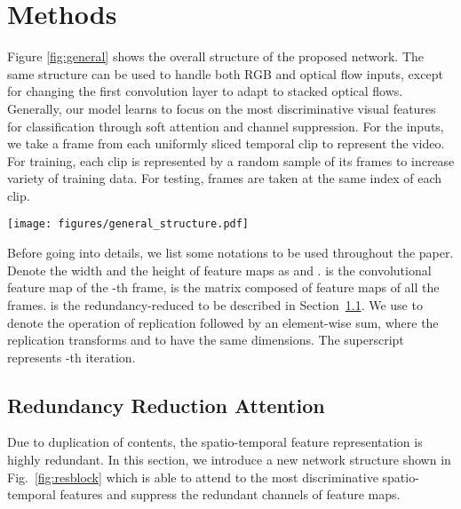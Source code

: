 \documentclass[runningheads]{llncs}
\begin{document}
 \section{Methods}
Figure \ref{fig:general} shows the overall structure of the proposed network. The same structure can be used to handle both RGB and optical flow inputs, except for changing the first convolution layer to adapt to stacked optical flows. Generally, our model learns to focus on the most discriminative visual features for classification through soft attention and channel suppression. For the inputs, we take a frame from each uniformly sliced temporal clip to represent the video. For training, each clip is represented by a random sample of its frames to increase variety of training data. For testing, frames are taken at the same index of each clip.
\begin{figure*}[htbp]
\centering
\texttt{[image: figures/general\_structure.pdf]}
\caption{The general structure of the proposed model. Input sequences are divided into clips of the same length. One frame or flow stack is sampled from each clip. The CNNs extract feature maps from the sampled frames, then the RRA modules iteratively updates the feature maps. Each summary feature vector gives one classification score via the classifiers, and the scores are averaged as the final prediction. }
\label{fig:general}
\end{figure*}
Before going into details, we list some notations to be used throughout the paper. Denote the width and the height of feature maps as  and .  is the convolutional feature map of the -th frame,  is the matrix composed of feature maps of all the  frames.  is the redundancy-reduced  to be described in Section~\ref{sec:rra}. We use  to denote the operation of replication followed by an element-wise sum, where the replication transforms  and  to have the same dimensions. The superscript  represents -th iteration.




\subsection{Redundancy Reduction Attention}\label{sec:rra}
Due to duplication of contents, the spatio-temporal feature representation  is highly redundant. In this section, we introduce a new network structure shown in Fig.~\ref{fig:resblock} which is able to attend to the most discriminative spatio-temporal features and suppress the redundant channels of feature maps.
\end{document}

